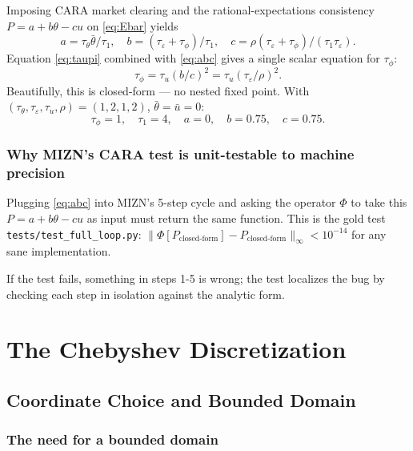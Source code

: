\documentclass[11pt,oneside]{book}
\theoremstyle{definition}
\begin{document}
\begin{tcolorbox}[title=\textbf{CRRA market-clearing bisection (matches \texttt{crra\_clear\_nb} in MIZN)},
                    colback=gray!5, colframe=black]
Imposing CARA market clearing and the rational-expectations consistency
$P = a + b\theta - cu$ on \eqref{eq:Ebar} yields
\begin{equation}
\boxed{\quad
a = \tau_\theta \bar\theta / \tau_1, \quad
b = (\tau_\varepsilon + \tau_\phi)/\tau_1, \quad
c = \rho(\tau_\varepsilon + \tau_\phi)/(\tau_1 \tau_\varepsilon).\quad
}
\label{eq:abc}
\end{equation}
Equation \eqref{eq:taupi} combined with \eqref{eq:abc} gives a single scalar
equation for $\tau_\phi$:
\begin{equation}
\tau_\phi = \tau_u (b/c)^2 = \tau_u (\tau_\varepsilon/\rho)^2.
\label{eq:taupi_closed}
\end{equation}
Beautifully, this is closed-form --- no nested fixed point. With
$(\tau_\theta, \tau_\varepsilon, \tau_u, \rho) = (1, 2, 1, 2)$,
$\bar\theta = \bar u = 0$:
\begin{equation}
\tau_\phi = 1,\quad \tau_1 = 4, \quad a = 0,\quad b = 0.75,\quad c = 0.75.
\end{equation}

\section{Why MIZN's CARA test is unit-testable to machine precision}

Plugging \eqref{eq:abc} into MIZN's 5-step cycle and asking the operator
$\Phi$ to take this $P = a + b\theta - cu$ as input must return the same
function. This is the gold test
\texttt{tests/test\_full\_loop.py}: $\|\Phi[P_{\text{closed-form}}] -
P_{\text{closed-form}}\|_\infty < 10^{-14}$ for any sane implementation.

If the test fails, something in steps 1-5 is wrong; the test localizes the
bug by checking each step in isolation against the analytic form.

\part{The Chebyshev Discretization}
\label{part:cheby}

\chapter{Coordinate Choice and Bounded Domain}
\label{ch:coords}

\section{The need for a bounded domain}


\end{tcolorbox}
\end{document}
